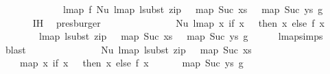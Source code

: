 \begin{isabellebody}
\ \ \ \ \ \ \ \ \ \ \ \ \ lmap\ f\ {\isacharparenleft}{\kern0pt}Nu\ {\isacharparenleft}{\kern0pt}lmap\ {\isacharparenleft}{\kern0pt}lsubst\ {\isacharparenleft}{\kern0pt}zip\ {\isacharparenleft}{\kern0pt}{}\ {\isacharhash}{\kern0pt}\ map\ Suc\ xs{\isacharparenright}{\kern0pt}\ {\isacharparenleft}{\kern0pt}{}\ {\isacharhash}{\kern0pt}\ map\ Suc\ ys{\isacharparenright}{\kern0pt}{\isacharparenright}{\kern0pt}{\isacharparenright}{\kern0pt}\ g{\isacharparenright}{\kern0pt}{\isacharparenright}{\kern0pt}{\isachardoublequoteclose}\isanewline
\ \ \ \ \ \isamarkupfalse%
\ IH{}\ \isamarkupfalse%
\ presburger\isanewline
\ \ \isamarkupfalse%
\ \isamarkupfalse%
\ {\isachardoublequoteopen}{\isachardot}{\kern0pt}{\isachardot}{\kern0pt}{\isachardot}{\kern0pt}\ {\isacharequal}{\kern0pt}\isanewline
\ \ \ \ \ \ \ \ Nu\ {\isacharparenleft}{\kern0pt}lmap\ {\isacharparenleft}{\kern0pt}{\isasymlambda}x{\isachardot}{\kern0pt}\ if\ x\ {\isacharequal}{\kern0pt}\ {}\ then\ x\ else\ {\isacharparenleft}{\kern0pt}f\ {\isacharparenleft}{\kern0pt}x\ {\isacharminus}{\kern0pt}\ {}{\isacharparenright}{\kern0pt}\ {\isacharplus}{\kern0pt}\ {}{\isacharparenright}{\kern0pt}{\isacharparenright}{\kern0pt}\isanewline
\ \ \ \ \ \ \ \ {\isacharparenleft}{\kern0pt}lmap\ {\isacharparenleft}{\kern0pt}lsubst\ {\isacharparenleft}{\kern0pt}zip\ {\isacharparenleft}{\kern0pt}{}\ {\isacharhash}{\kern0pt}\ map\ Suc\ xs{\isacharparenright}{\kern0pt}\ {\isacharparenleft}{\kern0pt}{}\ {\isacharhash}{\kern0pt}\ map\ Suc\ ys{\isacharparenright}{\kern0pt}{\isacharparenright}{\kern0pt}{\isacharparenright}{\kern0pt}\ g{\isacharparenright}{\kern0pt}{\isacharparenright}{\kern0pt}{\isachardoublequoteclose}\isanewline
\ \ \ \ \isamarkupfalse%
\ lmap{\isachardot}{\kern0pt}simps{\isacharparenleft}{\kern0pt}{}{\isacharparenright}{\kern0pt}\ \isamarkupfalse%
\ blast\isanewline
\ \ \isamarkupfalse%
\ \isamarkupfalse%
\ {\isachardoublequoteopen}{\isachardot}{\kern0pt}{\isachardot}{\kern0pt}{\isachardot}{\kern0pt}\ {\isacharequal}{\kern0pt}\isanewline
\ \ \ \ \ \ \ \ Nu\ {\isacharparenleft}{\kern0pt}{\isacharparenleft}{\kern0pt}lmap\ {\isacharparenleft}{\kern0pt}lsubst\ {\isacharparenleft}{\kern0pt}zip\ {\isacharparenleft}{\kern0pt}{}\ {\isacharhash}{\kern0pt}\ map\ Suc\ xs{\isacharparenright}{\kern0pt}\isanewline
\ \ \ \ {\isacharparenleft}{\kern0pt}map\ {\isacharparenleft}{\kern0pt}{\isasymlambda}x{\isachardot}{\kern0pt}\ if\ x\ {\isacharequal}{\kern0pt}\ {}\ then\ x\ else\ {\isacharparenleft}{\kern0pt}f\ {\isacharparenleft}{\kern0pt}x\ {\isacharminus}{\kern0pt}\ {}{\isacharparenright}{\kern0pt}\ {\isacharplus}{\kern0pt}\ {}{\isacharparenright}{\kern0pt}{\isacharparenright}{\kern0pt}\ {\isacharparenleft}{\kern0pt}{}\ {\isacharhash}{\kern0pt}\ map\ Suc\ ys{\isacharparenright}{\kern0pt}{\isacharparenright}{\kern0pt}{\isacharparenright}{\kern0pt}{\isacharparenright}{\kern0pt}\ g{\isacharparenright}{\kern0pt}{\isacharparenright}{\kern0pt}{\isachardoublequoteclose}\isanewline

\end{isabellebody}
